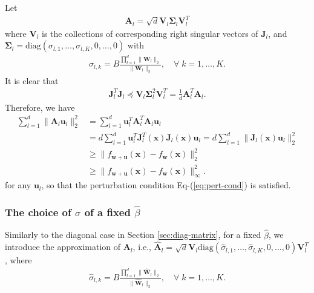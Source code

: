 \documentclass[journal]{IEEEtran} %
\def\eqref#1{Eq-(\ref{#1})}
\newcommand{\nn}{\nonumber}
\def\vu{{\bm{u}}}
\def\vw{{\bm{w}}}
\def\vx{{\bm{x}}}
\def\mA{{\bm{A}}}
\def\mJ{{\bm{J}}}
\def\mV{{\bm{V}}}
\def\mW{{\bm{W}}}
\def\mSigma{{\bm{\Sigma}}}
\newcommand{\Norm}[1]{\|#1\|}
\begin{document}
Let 
\begin{align}
    \mA_l = \sqrt{d} \mV_{l} \mSigma_{l} \mV_{l}^T
\end{align}
where $\mV_l$ is the collections of corresponding right singular vectors of $\mJ_l$, and $\mSigma_l=\mathrm{diag} (\sigma_{l,1},\dots,\sigma_{l,K}, 0, \dots,0)$ with
\begin{align}
    \sigma_{l,k} = B\frac{\prod_{l=1}^d \Norm{\mW_l}_2}{\Norm{\mW_l}_2}, \quad 
    \forall\; k=1,\dots,K.
\end{align}
It is clear that 
\begin{align}
\mJ_l^T \mJ_l \preceq \mV_{l} \mSigma_{l}^2 \mV_{l}^T = \frac{1}{d}\mA_l^T\mA_l.
\end{align}
Therefore, we have
\begin{align}
    \sum_{l=1}^d \Norm{\mA_l \vu_l}_2^2 &= \sum_{l=1}^d\vu_l^T \mA_l^T \mA_l \vu_l \\
    &=d \sum_{l=1}^d\vu_l^T \mJ_l^T(\vx) \mJ_l(\vx) \vu_l = d \sum_{l=1}^d \Norm{\mJ_l(\vx) \vu_l}_2^2 \nn\\
    &\ge \Norm{f_{\vw+\vu}(\vx)-f_{\vw}(\vx)}_2^2\\
     & \ge \Norm{f_{\vw+\vu}(\vx)-f_{\vw}(\vx)}_\infty^2.
\end{align}
for any $\vu_l$, so that the perturbation condition \eqref{eq:pert-cond} is satisfied.


\subsubsection{The choice of $\sigma$ of a fixed $\hat{\beta}$}
Similarly to the diagonal case in Section \ref{sec:diag-matrix}, for a fixed $\hat{\beta}$, we introduce the approximation of $\mA_l$, i.e., $\hat{\mA}_l = \sqrt{d} \mV_l \mathrm{diag}(\hat{\sigma}_{l,1},\dots,\hat{\sigma}_{l,K},0,\dots,0)\mV_l^T$, where
\begin{align}
    \hat{\sigma}_{l,k} = B\frac{\prod_{l=1}^d \Norm{\hat{\mW}_l}_2}{\Norm{\hat{\mW}_l}_2}, \quad \forall\; k=1,\dots,K.
\end{align}
\end{document}
